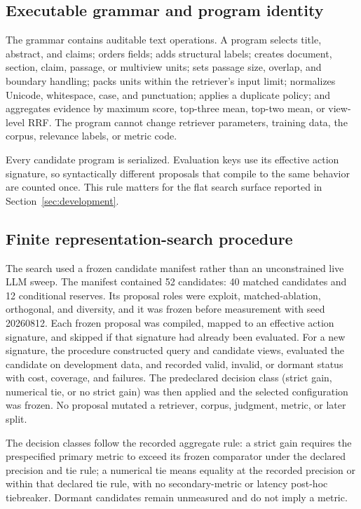 \documentclass[final,5p,times,twocolumn]{elsarticle}
\begin{document}
\subsection{Executable grammar and program identity}

The grammar contains auditable text operations. A program selects title,
abstract, and claims; orders fields; adds structural labels; creates document,
section, claim, passage, or multiview units; sets passage size, overlap, and
boundary handling; packs units within the retriever's input limit; normalizes
Unicode, whitespace, case, and punctuation; applies a duplicate policy; and
aggregates evidence by maximum score, top-three mean, top-two mean, or
view-level RRF. The program cannot change retriever parameters, training data,
the corpus, relevance labels, or metric code.

Every candidate program is serialized. Evaluation keys use its effective
action signature, so syntactically different proposals that compile to the
same behavior are counted once. This rule matters for the flat search surface
reported in Section~\ref{sec:development}.

\subsection{Finite representation-search procedure}

The search used a frozen candidate manifest rather than an unconstrained live
LLM sweep. The manifest contained 52 candidates: 40 matched candidates and 12
conditional reserves. Its proposal roles were exploit, matched-ablation,
orthogonal, and diversity, and it was frozen before measurement with seed
20260812. Each frozen proposal was compiled, mapped to an effective action
signature, and skipped if that signature had already been evaluated. For a
new signature, the procedure constructed query and candidate views, evaluated
the candidate on development data, and recorded valid, invalid, or dormant
status with cost, coverage, and failures. The predeclared decision class
(strict gain, numerical tie, or no strict gain) was then applied and the
selected configuration was frozen. No proposal mutated a retriever, corpus,
judgment, metric, or later split.

The decision classes follow the recorded aggregate rule: a strict gain requires
the prespecified primary metric to exceed its frozen comparator under the
declared precision and tie rule; a numerical tie means equality at the
recorded precision or within that declared tie rule, with no secondary-metric
or latency post-hoc tiebreaker. Dormant candidates remain unmeasured and do
not imply a metric.
\end{document}
